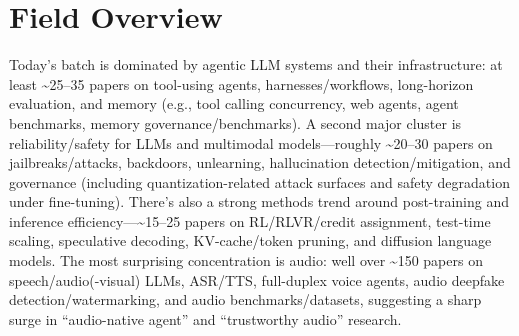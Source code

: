 \documentclass[12pt,letterpaper]{article}
\begin{document}
\medskip



\section*{Field Overview}
{\footnotesize Today's batch is dominated by agentic LLM systems and their infrastructure: at least \textasciitilde{}25--35 papers on tool-using agents, harnesses/workflows, long-horizon evaluation, and memory (e.g., tool calling concurrency, web agents, agent benchmarks, memory governance/benchmarks). A second major cluster is reliability/safety for LLMs and multimodal models---roughly \textasciitilde{}20--30 papers on jailbreaks/attacks, backdoors, unlearning, hallucination detection/mitigation, and governance (including quantization-related attack surfaces and safety degradation under fine-tuning). There's also a strong methods trend around post-training and inference efficiency---\textasciitilde{}15--25 papers on RL/RLVR/credit assignment, test-time scaling, speculative decoding, KV-cache/token pruning, and diffusion language models. The most surprising concentration is audio: well over \textasciitilde{}150 papers on speech/audio(-visual) LLMs, ASR/TTS, full-duplex voice agents, audio deepfake detection/watermarking, and audio benchmarks/datasets, suggesting a sharp surge in ``audio-native agent'' and ``trustworthy audio'' research.}
\end{document}
